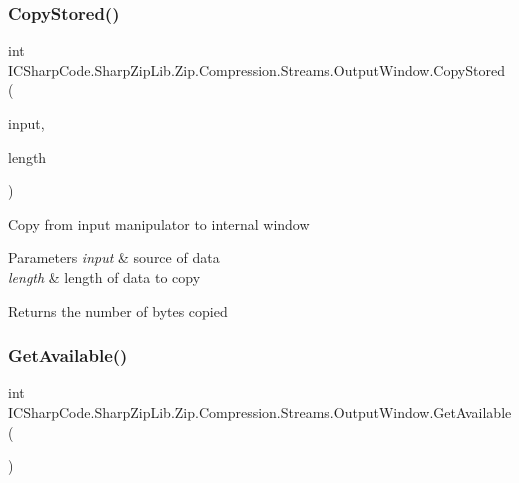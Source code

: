\subsubsection{\texorpdfstring{Copy\+Stored()}{CopyStored()}\hspace{0.1cm}{\footnotesize\ttfamily [2/2]}}
{\footnotesize\ttfamily int I\+C\+Sharp\+Code.\+Sharp\+Zip\+Lib.\+Zip.\+Compression.\+Streams.\+Output\+Window.\+Copy\+Stored (\begin{DoxyParamCaption}\item[{\hyperlink{class_i_c_sharp_code_1_1_sharp_zip_lib_1_1_zip_1_1_compression_1_1_streams_1_1_stream_manipulator}{Stream\+Manipulator}}]{input,  }\item[{int}]{length }\end{DoxyParamCaption})\hspace{0.3cm}{\ttfamily [inline]}}



Copy from input manipulator to internal window 


\begin{DoxyParams}{Parameters}
{\em input} & source of data\\
\hline
{\em length} & length of data to copy\\
\hline
\end{DoxyParams}
\begin{DoxyReturn}{Returns}
the number of bytes copied
\end{DoxyReturn}
\mbox{\label{class_i_c_sharp_code_1_1_sharp_zip_lib_1_1_zip_1_1_compression_1_1_streams_1_1_output_window_a1ae7b10eae496ec980847ad1b89fa689}} 
\subsubsection{\texorpdfstring{Get\+Available()}{GetAvailable()}\hspace{0.1cm}{\footnotesize\ttfamily [1/2]}}
{\footnotesize\ttfamily int I\+C\+Sharp\+Code.\+Sharp\+Zip\+Lib.\+Zip.\+Compression.\+Streams.\+Output\+Window.\+Get\+Available (\begin{DoxyParamCaption}{ }\end{DoxyParamCaption})\hspace{0.3cm}{\ttfamily [inline]}}



